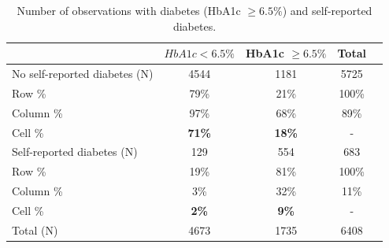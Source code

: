\documentclass[12pt,english]{article}
\begin{document}
\begin{table}[ht]
\caption{\label{tab:Biomarker_observations}Number of observations with diabetes (HbA1c $\geq 6.5\%$) and self-reported diabetes.}
\begin{center}
\begin{adjustbox}{max width=\linewidth}
\begin{threeparttable}
{
\def\sym#1{\ifmmode^{#1}\else\(^{#1}\)\fi}
\begin{tabular}{lcccc}
\toprule
            &\multicolumn{1}{c}{$HbA1c < 6.5\%$}&\multicolumn{1}{c}{HbA1c $\geq 6.5\%$}&\multicolumn{1}{c}{Total}\\
\midrule
No self-reported diabetes (N) & 4544 & 1181 & 5725 &  \\
\hspace*{10mm}Row  \% & 79\% & 21\% & 100\% &  \\
\hspace*{10mm}Column \% & 97\% & 68\% & 89\% &  \\
\hspace*{10mm}Cell \% & \textbf{71\%} & \textbf{18\%} & - & \\
Self-reported diabetes (N) & 129 & 554 & 683 &  \\
\hspace*{10mm}Row \%  & 19\% & 81\% & 100\% &  \\
\hspace*{10mm}Column \% & 3\% & 32\% & 11\% &  \\
\hspace*{10mm}Cell \% & \textbf{2\%} &\textbf{9\%} &- & \\
Total (N) & 4673 & 1735 & 6408 &  \\ 
\bottomrule
\end{tabular}
\begin{tablenotes}
\item
\end{tablenotes}
}
\end{threeparttable}
\end{adjustbox}
\end{center}
\end{table}
\end{document}
